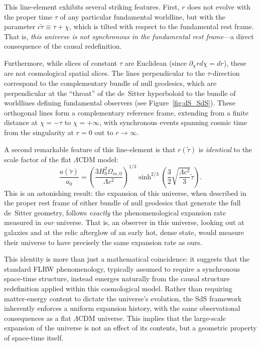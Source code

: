 \documentclass[aps,prd,reprint,superscriptaddress]{revtex4-2}
\begin{document}
This line-element exhibits several striking features. First, $r$ does not evolve with the proper time $\tau$ of any particular fundamental worldline, but with the parameter $c\tilde{\tau}\equiv\tau+\chi$, which is tilted with respect to the fundamental rest frame. That is, \textit{this universe is not synchronous in the fundamental rest frame}---a direct consequence of the causal redefinition.

Furthermore, while slices of constant $\tau$ are Euclidean (since $\partial_{\chi}rd\chi=dr$), these are not cosmological spatial slices. The lines perpendicular to the $\tau$-direction correspond to the complementary bundle of null geodesics, which are perpendicular at the ``throat'' of the de~Sitter hyperboloid to the bundle of worldlines defining fundamental observers (see Figure~\ref{fig:dS_SdS}). These orthogonal lines form a complementary reference frame, extending from a finite distance at $\chi=-\tau$ to $\chi=+\infty$, with synchronous events spanning cosmic time from the singularity at $r=0$ out to $r\rightarrow\infty$. 

A second remarkable feature of this line-element is that $r(\tilde{\tau})$ is \textit{identical} to the scale factor of the flat $\Lambda$CDM model:
\begin{equation} 
    \frac{a(\tilde{\tau})}{a_0}=\left(\frac{3H_0^2\Omega_{m,0}}{\Lambda c^2}\right)^{1/3}\sinh^{2/3}\left(\frac{3}{2}\sqrt{\frac{\Lambda c^2}{3}}\tilde{\tau}\right).\label{eq:scalefac} 
\end{equation} 
This is an astonishing result: the expansion of this universe, when described in the proper rest frame of either bundle of null geodesics that generate the full de~Sitter geometry, follows \textit{exactly} the phenomenological expansion rate measured in \textit{our} universe. That is, an observer in this universe, looking out at galaxies and at the relic afterglow of an early hot, dense state, would measure their universe to have precisely the same expansion rate as ours.

This identity is more than just a mathematical coincidence: it suggests that the standard FLRW phenomenology, typically assumed to require a synchronous space-time structure, instead emerges naturally from the causal structure redefinition applied within this cosmological model. Rather than requiring matter-energy content to dictate the universe's evolution, the SdS framework inherently enforces a uniform expansion history, with the same observational consequences as a flat $\Lambda$CDM universe. This implies that the large-scale expansion of the universe is not an effect of its contents, but a geometric property of space-time itself.
\end{document}
